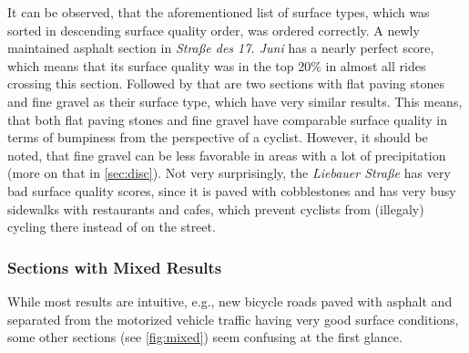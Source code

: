 It can be observed, that the aforementioned list of surface types, which was sorted in descending surface quality order, was ordered correctly.
A newly maintained asphalt section in \textit{Straße des 17. Juni} has a nearly perfect score, which means that its surface quality was in the top 20\% in almost all rides crossing this section.
Followed by that are two sections with flat paving stones and fine gravel as their surface type, which have very similar results.
This means, that both flat paving stones and fine gravel have comparable surface quality in terms of bumpiness from the perspective of a cyclist.
However, it should be noted, that fine gravel can be less favorable in areas with a lot of precipitation (more on that in \cref{sec:disc}).
Not very surprisingly, the \textit{Liebauer Straße} has very bad surface quality scores, since it is paved with cobblestones and has very busy sidewalks with restaurants and cafes, which prevent cyclists from (illegaly) cycling there instead of on the street.

\begin{table}%
\centering
\caption{Surface Quality Analysis Evaluation Results Showing Mean, Median and Standard Deviation of Sections With Clear Results}%
\label{tab:clear}
\end{table}

\subsubsection{Sections with Mixed Results}
\label{subsubsec:sections_with_mixed_results}
While most results are intuitive, e.g., new bicycle roads paved with asphalt and separated from the motorized vehicle traffic having very good surface conditions, some other sections (see \cref{fig:mixed}) seem confusing at the first glance.

